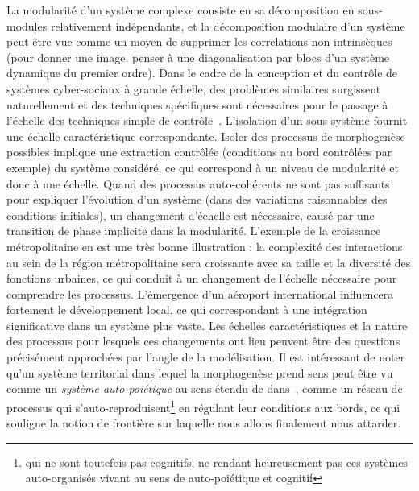 {La modularité d'un système complexe consiste en sa décomposition en sous-modules relativement indépendants, et la décomposition modulaire d'un système peut être vue comme un moyen de supprimer les correlations non intrinsèques~\cite{2015arXiv150904386K} (pour donner une image, penser à une diagonalisation par blocs d'un système dynamique du premier ordre). Dans le cadre de la conception et du contrôle de systèmes cyber-sociaux à grande échelle, des problèmes similaires surgissent naturellement et des techniques spécifiques sont nécessaires pour le passage à l'échelle des techniques simple de contrôle~\cite{2017arXiv170105880W}. L'isolation d'un sous-système fournit une échelle caractéristique correspondante. Isoler des processus de morphogenèse possibles implique une extraction contrôlée (conditions au bord contrôlées par exemple) du système considéré, ce qui correspond à un niveau de modularité et donc à une échelle. Quand des processus auto-cohérents ne sont pas suffisants pour expliquer l'évolution d'un système (dans des variations raisonnables des conditions initiales), un changement d'échelle est nécessaire, 
causé par une transition de phase implicite dans la modularité. L'exemple de la croissance métropolitaine en est une très bonne illustration : la complexité des interactions au sein de la région métropolitaine sera croissante avec sa taille et la diversité des fonctions urbaines, ce qui conduit à un changement de l'échelle nécessaire pour comprendre les processus. L'émergence d'un aéroport international influencera fortement le développement local, 
ce qui correspondant à une intégration significative dans un système plus vaste. Les échelles caractéristiques et la nature des processus pour lesquels ces changements ont lieu peuvent être des questions précisément approchées par l'angle de la modélisation. Il est intéressant 
de noter qu'un système territorial dans lequel la morphogenèse prend sens peut être vu comme un \emph{système auto-poiétique} %
 au sens étendu de  dans~\cite{bourgine2004autopoiesis}, comme un réseau de processus qui s'auto-reproduisent\footnote{qui ne sont toutefois pas cognitifs, ne rendant heureusement pas ces systèmes auto-organisés vivant au sens de auto-poiétique et cognitif} en régulant leur conditions aux bords, ce qui souligne la notion de frontière sur laquelle nous allons finalement nous attarder.
}


